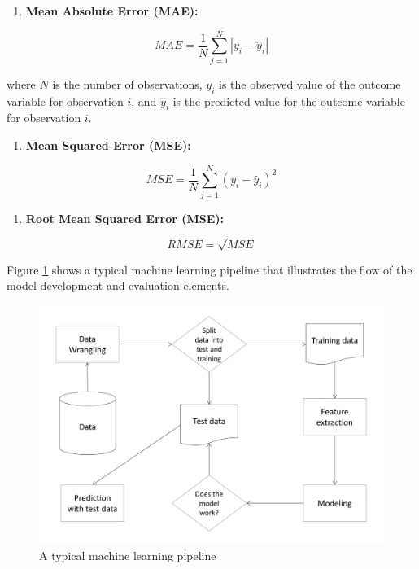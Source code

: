 \documentclass[]{book}
\providecommand{\tightlist}{%
  \setlength{\itemsep}{0pt}\setlength{\parskip}{0pt}}
\begin{document}
\begin{enumerate}
\def\labelenumi{\arabic{enumi}.}
\tightlist
\item
  \textbf{Mean Absolute Error (MAE):}
\end{enumerate}

\[
MAE = \frac{1}{N} \sum_{j=1}^N |y_i-\hat{y}_i|
\]

where \(N\) is the number of observations, \(y_i\) is the observed value of the outcome variable for observation \(i\), and \(\hat{y}_i\) is the predicted value for the outcome variable for observation \(i\).

\begin{enumerate}
\def\labelenumi{\arabic{enumi}.}
\setcounter{enumi}{1}
\tightlist
\item
  \textbf{Mean Squared Error (MSE):}
\end{enumerate}

\[
MSE = \frac{1}{N} \sum_{j=1}^N (y_i-\hat{y}_i)^2
\]

\begin{enumerate}
\def\labelenumi{\arabic{enumi}.}
\setcounter{enumi}{2}
\tightlist
\item
  \textbf{Root Mean Squared Error (MSE):}
\end{enumerate}

\[
RMSE = \sqrt{MSE}
\]

Figure \ref{fig:fig5-3c} shows a typical machine learning pipeline that illustrates the flow of the model development and evaluation elements.

\begin{figure}
\includegraphics[width=1\linewidth]{images/modeling_pipeline} \caption{A typical machine learning pipeline}\label{fig:fig5-3c}
\end{figure}
\end{document}
